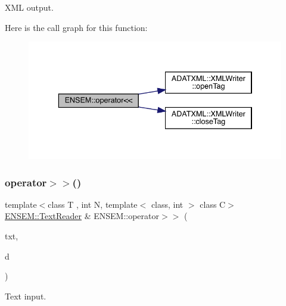X\+ML output. 

Here is the call graph for this function\+:\nopagebreak
\begin{figure}[H]
\begin{center}
\leavevmode
\includegraphics[width=336pt]{df/d0a/group__primmatrix_ga88162a3095bbb5b40ba8100093befe2b_cgraph}
\end{center}
\end{figure}
\mbox{\label{group__primmatrix_ga94a915150324a06d2d330515358811f2}} 
\subsubsection{\texorpdfstring{operator$>$$>$()}{operator>>()}}
{\footnotesize\ttfamily template$<$class T , int N, template$<$ class, int $>$ class C$>$ \\
\mbox{\hyperlink{classENSEM_1_1TextReader}{E\+N\+S\+E\+M\+::\+Text\+Reader}} \& E\+N\+S\+E\+M\+::operator$>$$>$ (\begin{DoxyParamCaption}\item[{\mbox{\hyperlink{classENSEM_1_1TextReader}{E\+N\+S\+E\+M\+::\+Text\+Reader}} \&}]{txt,  }\item[{\mbox{\hyperlink{classENSEM_1_1PMatrix}{P\+Matrix}}$<$ T, \mbox{\hyperlink{adat__devel_2lib_2hadron_2operator__name__util_8cc_a7722c8ecbb62d99aee7ce68b1752f337}{N}}, C $>$ \&}]{d }\end{DoxyParamCaption})\hspace{0.3cm}{\ttfamily [inline]}}



Text input. 

\mbox{\label{group__primmatrix_ga95fe2504ecc461173cb780afe6dbbbf4}} 
